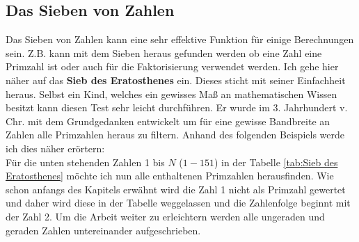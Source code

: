 \documentclass[german,12pt,a4paper]{article}
\begin{document}
\subsection{Das Sieben von Zahlen}\label{Das Sieben von Zahlen}
Das Sieben von Zahlen kann eine sehr effektive Funktion für einige Berechnungen sein.
Z.B. kann mit dem Sieben heraus gefunden werden ob eine Zahl eine Primzahl ist oder auch für die Faktorisierung verwendet werden.
Ich gehe hier näher auf das \textbf{Sieb des Eratosthenes} ein.
Dieses sticht mit seiner Einfachheit heraus.
Selbst ein Kind, welches ein gewisses Maß an mathematischen Wissen besitzt kann diesen Test sehr leicht durchführen.
Er wurde im 3. Jahrhundert v. Chr. mit dem Grundgedanken entwickelt um für eine gewisse Bandbreite an Zahlen alle Primzahlen heraus zu filtern.
Anhand des folgenden Beispiels werde ich dies näher erörtern:\\
Für die unten stehenden Zahlen 1 bis $N$ ($1-151$) in der Tabelle \ref{tab:Sieb des Eratosthenes} möchte ich nun alle enthaltenen Primzahlen herausfinden.
Wie schon anfangs des Kapitels erwähnt wird die Zahl 1 nicht als Primzahl gewertet und daher wird diese in der Tabelle weggelassen und die Zahlenfolge beginnt mit der Zahl 2.
Um die Arbeit weiter zu erleichtern werden alle ungeraden und geraden Zahlen untereinander aufgeschrieben.
\end{document}

